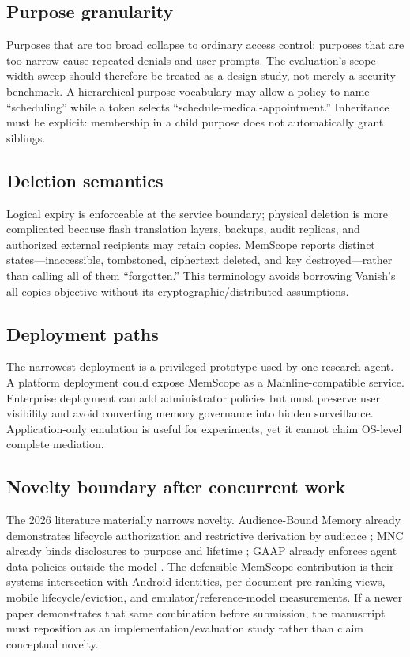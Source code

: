 \subsection{Purpose granularity}

Purposes that are too broad collapse to ordinary access control; purposes that are too narrow cause repeated denials and user prompts. The evaluation's scope-width sweep should therefore be treated as a design study, not merely a security benchmark. A hierarchical purpose vocabulary may allow a policy to name ``scheduling'' while a token selects ``schedule-medical-appointment.'' Inheritance must be explicit: membership in a child purpose does not automatically grant siblings.

\subsection{Deletion semantics}

Logical expiry is enforceable at the service boundary; physical deletion is more complicated because flash translation layers, backups, audit replicas, and authorized external recipients may retain copies. MemScope reports distinct states---inaccessible, tombstoned, ciphertext deleted, and key destroyed---rather than calling all of them ``forgotten.'' This terminology avoids borrowing Vanish's all-copies objective \citep{geambasu2009vanish} without its cryptographic/distributed assumptions.

\subsection{Deployment paths}

The narrowest deployment is a privileged prototype used by one research agent. A platform deployment could expose MemScope as a Mainline-compatible service. Enterprise deployment can add administrator policies but must preserve user visibility and avoid converting memory governance into hidden surveillance. Application-only emulation is useful for experiments, yet it cannot claim OS-level complete mediation.

\subsection{Novelty boundary after concurrent work}

The 2026 literature materially narrows novelty. Audience-Bound Memory already demonstrates lifecycle authorization and restrictive derivation by audience \citep{liu2026audience}; MNC already binds disclosures to purpose and lifetime \citep{xu2026mnc}; GAAP already enforces agent data policies outside the model \citep{stanley2026gaap}. The defensible MemScope contribution is their systems intersection with Android identities, per-document pre-ranking views, mobile lifecycle/eviction, and emulator/reference-model measurements. If a newer paper demonstrates that same combination before submission, the manuscript must reposition as an implementation/evaluation study rather than claim conceptual novelty.
